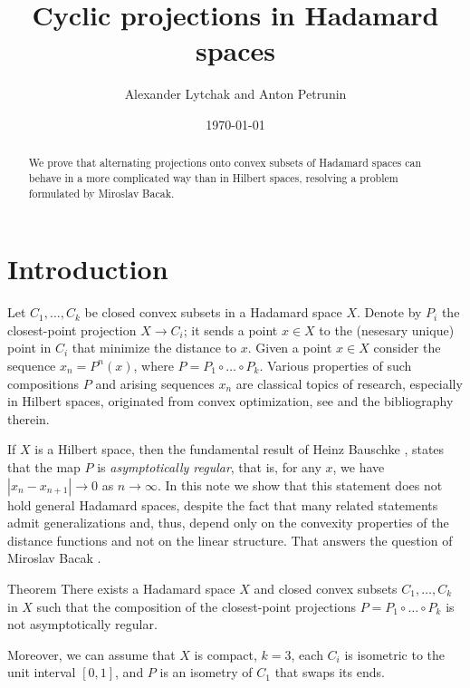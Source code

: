 \documentclass[a4paper,10pt]{article}
\begin{document}
\title{Cyclic projections in Hadamard spaces}	
\author{Alexander Lytchak and Anton Petrunin}
\date{\today}
\maketitle

\begin{abstract}
	We  prove that  alternating projections onto convex subsets of Hadamard spaces can behave in a more complicated way than in Hilbert spaces, resolving a problem formulated by Miroslav Bacak. 	
\end{abstract}



\section{Introduction}


Let  $C_1,\dots, C_k$ be closed convex subsets in a Hadamard space $X$.
Denote by $P_i$ the closest-point projection $X\to C_i$; it sends a point $x\in X$ to the (nesesary unique) point in $C_i$ that minimize the distance to $x$.
Given a point $x\in X$ consider the sequence $x_n=P^n(x)$, where
$P= P_1\circ \dots \circ P_k$.  Various properties of   such compositions  $P$ and arising  sequences $x_n$
are classical topics of research, especially in Hilbert spaces, originated from convex optimization, see \cite{Bac, Bac2, Bauschke}
and the bibliography therein.




If $X$ is a Hilbert space, then the fundamental result of Heinz Bauschke \cite{Bauschke,Kohlenbach}, states that the map $P$ is \emph{asymptotically regular}, that is, for any $x$, we have  $|x_n-x_{n+1}|\to 0$ as $n\to \infty$.
In this note we show that this statement does not hold general Hadamard spaces, despite the fact that many related statements
admit generalizations and, thus, depend only on the convexity properties of the distance functions and not on the linear structure. 
That answers the question of Miroslav Bacak \cite[Problem 6.13]{Bac}.

\begin{thm}{Theorem}\label{thm}
There exists a Hadamard space $X$ and closed convex subsets $C_1,\dots,C_k$ in $X$ such that the composition of the closest-point projections $P= P_1\circ \dots \circ P_k$ is not asymptotically regular.

Moreover, we can assume that $X$ is compact, $k=3$, each $C_i$ is isometric to the unit interval $[0,1]$, 
and $P$ is an isometry of $C_1$ that swaps its ends.
\end{thm}
\end{document}
